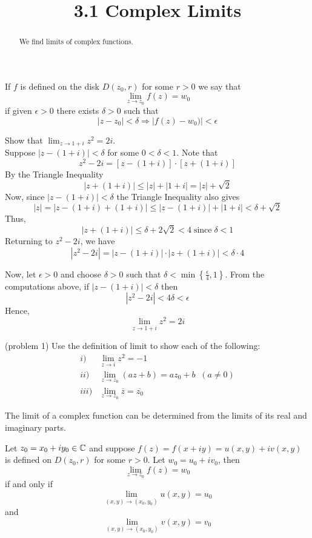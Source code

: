 \documentclass[handout]{ximera}
\title{3.1 Complex Limits}
\begin{document}
\begin{abstract}
We find limits of complex functions.
\end{abstract}

\maketitle


\begin{definition} If $f$ is defined on the disk $D(z_0, r)$ for some $r>0$ we say that
\[
\lim_{z \to z_0} f(z) = w_0
\]
if given $\epsilon > 0$ there exists $\delta >0$ such that 
\[
|z-z_0| < \delta \Rightarrow |f(z) - w_0)| < \epsilon
\]
\end{definition}
 

\begin{example}[example 1]
Show that $\displaystyle \lim_{z \to 1+i} z^2 = 2i$.\\[6pt]
Suppose $|z-(1+i)| < \delta$ for some $0< \delta < 1$.
Note that
\[
z ^2 - 2i=\left[z-(1+i)\right] \cdot \left[z + (1+i)\right]
\]
By the Triangle Inequality
\[
|z+(1+i)| \leq |z| + |1+i| = |z| + \sqrt 2
\]
Now, since $|z-(1+i)| < \delta$ the Triangle Inequality also gives
\[
|z| = |z-(1+i) +(1+i)| \leq |z-(1+i)| + |1+i| < \delta + \sqrt 2 
\]
Thus,
\[
|z+(1+i)| \leq \delta + 2\sqrt 2 <  4 \; \mbox{since} \; \delta < 1
\]
Returning to $z^2 - 2i$, we have
\[
|z ^2 - 2i| = |z-(1+i)| \cdot | z+(1+i)| < \delta \cdot 4
\]

Now, let $\epsilon > 0$ and choose $\delta> 0$ such that $\delta < \min\left\{\frac{\epsilon}{4}, 1\right\}$. 
From the computations above, if $|z-(1+i)| < \delta$ then
\[
|z^2 - 2i| < 4\delta < \epsilon
\]
Hence,
\[
\lim_{z \to 1+i} z^2 = 2i
\]


\end{example}

\begin{problem}(problem 1) Use the definition of limit to show each of the following:
\begin{align*}
i) & \displaystyle \lim_{z \to i} z^2 = -1\\
ii) & \displaystyle \lim_{z \to z_0} (az+b) = az_0 + b \;\;(a \neq 0)\\
iii) & \displaystyle \lim_{z \to z_0} \overline{z} = \overline{z_0}
\end{align*}
\end{problem}

The limit of a complex function can be determined from the limits of its real and imaginary parts.
\begin{proposition}
Let $z_0 = x_0 + iy_0 \in \mathbb C$ and suppose $f(z)=f(x+iy) = u(x,y) + iv(x,y)$ is defined on $D(z_0,r)$ for some $r>0$. Let $w_0 = u_0 + iv_0$, then
\[
\lim_{z \to z_0} f(z) = w_0 
\]
if and only if
\[
\lim_{(x,y) \to (x_0, y_0)} u(x,y) =  u_0 
\]
and
\[
\lim_{(x,y) \to (x_0, y_0)} v(x,y) =  v_0 
\]
\end{proposition}
\end{document}
